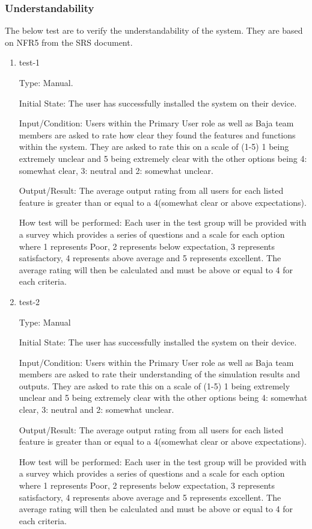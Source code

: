 \documentclass[12pt, titlepage]{article}
\begin{document}
\subsubsection{Understandability}

The below test are to verify the understandability of the system.
They are based on NFR5 from the SRS document.

\begin{enumerate}

\item{test-1\\}

Type: Manual.
					
Initial State: The user has successfully installed the system on their device.
					
Input/Condition: Users within the Primary User role as well as Baja team members are asked to rate how clear they found the features and functions within the system. 
They are asked to rate this on a scale of (1-5) 1 being extremely unclear and 5 being extremely clear with the other options being 4: somewhat clear, 3: neutral and 2: somewhat unclear. 
					
Output/Result: The average output rating from all users for each listed feature is greater than or equal to a 4(somewhat clear or above expectations).
					
How test will be performed: Each user in the test group will be provided with a survey which provides a series of questions and a scale for each option where 1 represents Poor, 2 represents below expectation, 3 represents satisfactory, 4 represents above average and 5 represents excellent.
The average rating will then be calculated and must be above or equal to 4 for each criteria.  

\item{test-2\\}

Type: Manual
					
Initial State: The user has successfully installed the system on their device.
					
Input/Condition: Users within the Primary User role as well as Baja team members are asked to rate their understanding of the simulation results and outputs. 
They are asked to rate this on a scale of (1-5) 1 being extremely unclear and 5 being extremely clear with the other options being 4: somewhat clear, 3: neutral and 2: somewhat unclear. 
					
Output/Result: The average output rating from all users for each listed feature is greater than or equal to a 4(somewhat clear or above expectations).
					
How test will be performed: Each user in the test group will be provided with a survey which provides a series of questions and a scale for each option where 1 represents Poor, 2 represents below expectation, 3 represents satisfactory, 4 represents above average and 5 represents excellent.
The average rating will then be calculated and must be above or equal to 4 for each criteria.  

\end{enumerate}
\end{document}
